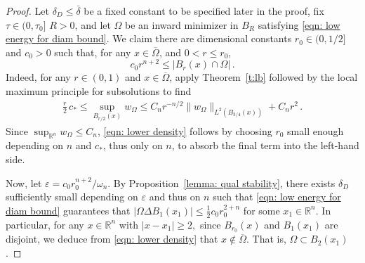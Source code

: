 \documentclass[10pt, reqno]{amsart}
\numberwithin{equation}{section}
\def\R{{\mathbb R}}
\def\e{\varepsilon}
\def\W{\Omega}
\def\om{\omega}
\def\ccdel{\bar{\delta}}
\begin{document}
\begin{proof} Let $\delta_D \le \ccdel$ be a fixed constant to be specified later in the proof, fix $\tau \in(0,\tau_0]$ $R>0$, and let $\W$ be an inward minimizer in $B_R$ satisfying \eqref{eqn: low energy for diam bound}.  We claim there are dimensional constants $r_0\in (0,1/2]$ and $c_0>0$ such that, for any $x \in \overline{\W}$, and $0< r \leq r_0$,
\begin{equation}
	\label{eqn: lower density}
c_0 r^{n+2} \leq  |B_{r}(x)\cap \W|\,.
\end{equation}
Indeed, for any $r \in (0,1)$ and $x \in \overline{\W}$, apply Theorem~\ref{t:lb} followed by the local maximum principle for subsolutions to find
	\begin{align*}
		\frac{r}{2}\, c_* \leq \sup_{B_{r/2}(x)} w_\W \leq C_n r^{-n/2} \| w_\W\|_{L^2(B_{3/4}(x))} +C_nr^2 \,.
	\end{align*}
    Since $ \sup_{\R^n} w_\W\leq C_n$, 
 \eqref{eqn: lower density} follows by choosing $r_0$ small enough depending on $n$ and $c_*$, thus only on $n$,  to absorb the final term into the left-hand side.   


Now, let $\e = c_0 r_0^{n+2}/\om_n$. By  Proposition~\ref{lemma: qual stability}, there exists $\delta_D$ sufficiently small depending on $\e$ and thus on $n$ such that \eqref{eqn: low energy for diam bound} guarantees that $|\W \Delta B_1(x_1)| \leq \frac{1}{2}c_0 r_0^{2+n}$ for some $x_1 \in \R^n$. In particular, for any $x \in \R^n$ with  $|x-x_1| \geq 2,$ since  $B_{r_0}(x)$  and $B_1(x_1)$ are disjoint, we deduce from \eqref{eqn: lower density} that $x \not\in \overline{\W}$. That is, $\W \subset B_2(x_1)$. 
\end{proof}

%
%
%
%
%
\medskip 
%
%
%
%
\end{document}
